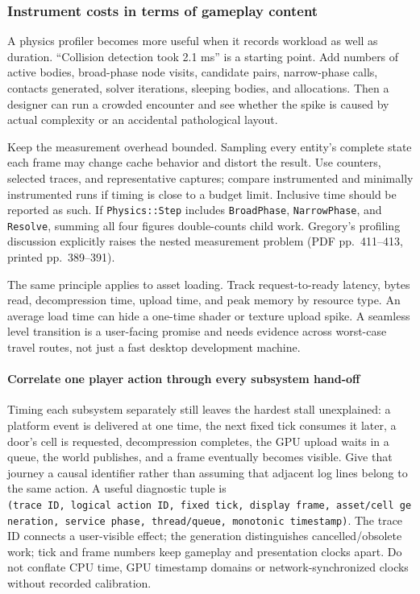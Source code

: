 \subsubsection{Instrument costs in terms of gameplay content}\label{instrument-costs-in-terms-of-gameplay-content}

A physics profiler becomes more useful when it records workload as well as duration. ``Collision detection took 2.1 ms'' is a starting point. Add numbers of active bodies, broad-phase node visits, candidate pairs, narrow-phase calls, contacts generated, solver iterations, sleeping bodies, and allocations. Then a designer can run a crowded encounter and see whether the spike is caused by actual complexity or an accidental pathological layout.

Keep the measurement overhead bounded. Sampling every entity's complete state each frame may change cache behavior and distort the result. Use counters, selected traces, and representative captures; compare instrumented and minimally instrumented runs if timing is close to a budget limit. Inclusive time should be reported as such. If \texttt{Physics::Step} includes \texttt{BroadPhase}, \texttt{NarrowPhase}, and \texttt{Resolve}, summing all four figures double-counts child work. Gregory's profiling discussion explicitly raises the nested measurement problem (PDF pp.~411--413, printed pp.~389--391).

The same principle applies to asset loading. Track request-to-ready latency, bytes read, decompression time, upload time, and peak memory by resource type. An average load time can hide a one-time shader or texture upload spike. A seamless level transition is a user-facing promise and needs evidence across worst-case travel routes, not just a fast desktop development machine.

\paragraph{Correlate one player action through every subsystem hand-off}\label{correlate-one-player-action-through-every-subsystem-hand-off}

Timing each subsystem separately still leaves the hardest stall unexplained: a platform event is delivered at one time, the next fixed tick consumes it later, a door's cell is requested, decompression completes, the GPU upload waits in a queue, the world publishes, and a frame eventually becomes visible. Give that journey a causal identifier rather than assuming that adjacent log lines belong to the same action. A useful diagnostic tuple is \texttt{(trace\ ID,\ logical\ action\ ID,\ fixed\ tick,\ display\ frame,\ asset/cell\ generation,\ service\ phase,\ thread/queue,\ monotonic\ timestamp)}. The trace ID connects a user-visible effect; the generation distinguishes cancelled/obsolete work; tick and frame numbers keep gameplay and presentation clocks apart. Do not conflate CPU time, GPU timestamp domains or network-synchronized clocks without recorded calibration.

